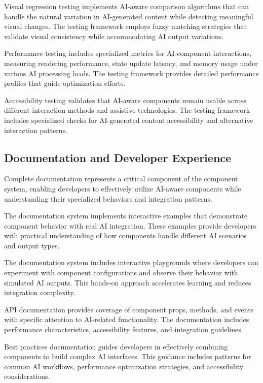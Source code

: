 Visual regression testing implements AI-aware comparison algorithms that can handle the natural variation in AI-generated content while detecting meaningful visual changes. The testing framework employs fuzzy matching strategies that validate visual consistency while accommodating AI output variations.

Performance testing includes specialized metrics for AI-component interactions, measuring rendering performance, state update latency, and memory usage under various AI processing loads. The testing framework provides detailed performance profiles that guide optimization efforts.

Accessibility testing validates that AI-aware components remain usable across different interaction methods and assistive technologies. The testing framework includes specialized checks for AI-generated content accessibility and alternative interaction patterns.

\subsection*{Documentation and Developer Experience}

Complete documentation represents a critical component of the component system, enabling developers to effectively utilize AI-aware components while understanding their specialized behaviors and integration patterns.

The documentation system implements interactive examples that demonstrate component behavior with real AI integration. These examples provide developers with practical understanding of how components handle different AI scenarios and output types.

\begin{infobox}[title=Documentation Features]
The documentation system includes interactive playgrounds where developers can experiment with component configurations and observe their behavior with simulated AI outputs. This hands-on approach accelerates learning and reduces integration complexity.
\end{infobox}

API documentation provides coverage of component props, methods, and events with specific attention to AI-related functionality. The documentation includes performance characteristics, accessibility features, and integration guidelines.

Best practices documentation guides developers in effectively combining components to build complex AI interfaces. This guidance includes patterns for common AI workflows, performance optimization strategies, and accessibility considerations.

